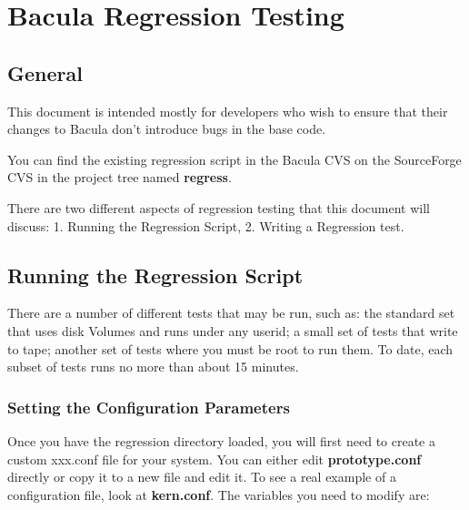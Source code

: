 
\section*{Bacula Regression Testing}
\label{_ChapterStart8}

\subsection*{General}

This document is intended mostly for developers who wish to ensure that their
changes to Bacula don't introduce bugs in the base code. 

You can find the existing regression script in the Bacula CVS on the
SourceForge CVS in the project tree named {\bf regress}. 

There are two different aspects of regression testing that this document will
discuss: 1. Running the Regression Script, 2. Writing a Regression test. 

\subsection*{Running the Regression Script}

There are a number of different tests that may be run, such as: the standard
set that uses disk Volumes and runs under any userid; a small set of tests
that write to tape; another set of tests where you must be root to run them.
To date, each subset of tests runs no more than about 15 minutes. 

\subsubsection*{Setting the Configuration Parameters}

Once you have the regression directory loaded, you will first need to create a
custom xxx.conf file for your system. You can either edit {\bf prototype.conf}
directly or copy it to a new file and edit it. To see a real example of a
configuration file, look at {\bf kern.conf}. The variables you need to modify
are: 

